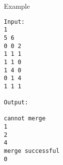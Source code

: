 Example  
\begin{verbatim}
Input:
1
5 6
0 0 2
1 1 1
1 1 0
1 4 0
0 1 4
1 1 1 

Output:

cannot merge
1
2
4
merge successful
0
\end{verbatim}